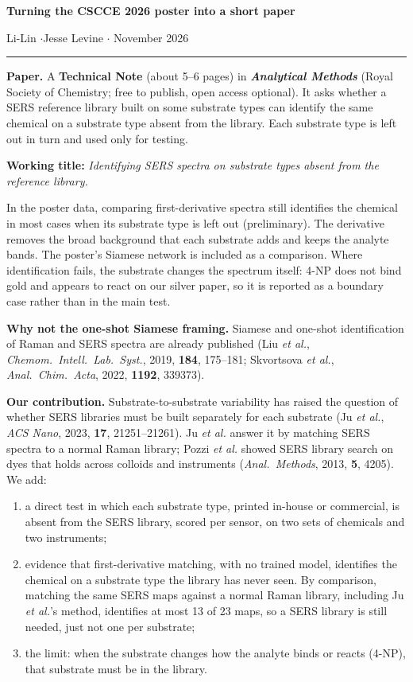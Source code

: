 \documentclass[10pt]{article}
\begin{document}
\color{black}

{\Large\bfseries Turning the CSCCE 2026 poster into a short paper\par}
\vspace{1pt}
Li-Lin \quad$\cdot$\quad Jesse Levine \quad$\cdot$ November 2026
\vspace{2pt}\hrule\vspace{2pt}

\textbf{Paper.} A \textbf{Technical Note} (about 5--6 pages) in \textbf{\emph{Analytical Methods}} (Royal Society of Chemistry; free to publish, open access optional). It asks whether a SERS reference library built on some substrate types can identify the same chemical on a substrate type absent from the library. Each substrate type is left out in turn and used only for testing.

\textbf{Working title:} \emph{Identifying SERS spectra on substrate types absent from the reference library.}

In the poster data, comparing first-derivative spectra still identifies the chemical in most cases when its substrate type is left out (preliminary). The derivative removes the broad background that each substrate adds and keeps the analyte bands. The poster's Siamese network is included as a comparison. Where identification fails, the substrate changes the spectrum itself: 4-NP does not bind gold and appears to react on our silver paper, so it is reported as a boundary case rather than in the main test.

\textbf{Why not the one-shot Siamese framing.} Siamese and one-shot identification of Raman and SERS spectra are already published (Liu \emph{et al.}, \emph{Chemom.\ Intell.\ Lab.\ Syst.}, 2019, \textbf{184}, 175--181; Skvortsova \emph{et al.}, \emph{Anal.\ Chim.\ Acta}, 2022, \textbf{1192}, 339373).

\textbf{Our contribution.} Substrate-to-substrate variability has raised the question of whether SERS libraries must be built separately for each substrate (Ju \emph{et al.}, \emph{ACS Nano}, 2023, \textbf{17}, 21251--21261). Ju \emph{et al.} answer it by matching SERS spectra to a normal Raman library; Pozzi \emph{et al.} showed SERS library search on dyes that holds across colloids and instruments (\emph{Anal.\ Methods}, 2013, \textbf{5}, 4205). We add:
\begin{enumerate}
\item a direct test in which each substrate type, printed in-house or commercial, is absent from the SERS library, scored per sensor, on two sets of chemicals and two instruments;
\item evidence that first-derivative matching, with no trained model, identifies the chemical on a substrate type the library has never seen. By comparison, matching the same SERS maps against a normal Raman library, including Ju \emph{et al.}'s method, identifies at most 13 of 23 maps, so a SERS library is still needed, just not one per substrate;
\item the limit: when the substrate changes how the analyte binds or reacts (4-NP), that substrate must be in the library.
\end{enumerate}
\end{document}
